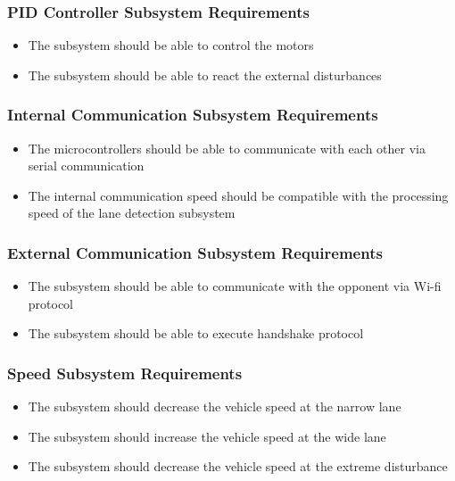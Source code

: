\documentclass[a4paper,12pt]{article}
\begin{document}
		\subsubsection{PID Controller Subsystem Requirements}
	
			\begin{itemize}
				\item The subsystem should be able to control the motors
				\item The subsystem should be able to react the external disturbances
			\end{itemize}
	
	
	
		\subsubsection{Internal Communication Subsystem Requirements}

			\begin{itemize}
				\item The microcontrollers should be able to communicate with each other via serial communication
				\item The internal communication speed should be compatible with the processing speed of the lane detection subsystem  
			\end{itemize}
	
		\subsubsection{External Communication Subsystem Requirements}	
	
			\begin{itemize}
				\item The subsystem should be able to communicate with the opponent via Wi-fi protocol
				\item The subsystem should be able to execute handshake protocol
			\end{itemize}
	
	
	
	
		\subsubsection{Speed Subsystem Requirements}	
		
			\begin{itemize}
				\item The subsystem should decrease the vehicle speed at the narrow lane 
				\item The subsystem should increase the vehicle speed at the wide lane 
				\item The subsystem should decrease the vehicle speed at the extreme disturbance  
			\end{itemize}
			
\end{document}
